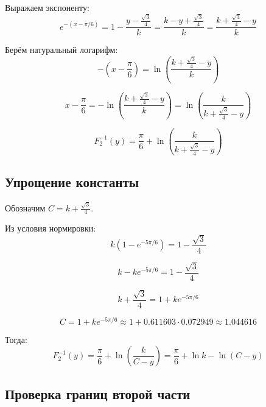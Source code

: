 \documentclass[12pt,a4paper]{article}
\begin{document}
Выражаем экспоненту:
\begin{equation}
e^{-(x-\pi/6)} = 1 - \frac{y - \frac{\sqrt{3}}{4}}{k} = \frac{k - y + \frac{\sqrt{3}}{4}}{k} = \frac{k + \frac{\sqrt{3}}{4} - y}{k}
\end{equation}

Берём натуральный логарифм:
\begin{equation}
-(x-\frac{\pi}{6}) = \ln\left(\frac{k + \frac{\sqrt{3}}{4} - y}{k}\right)
\end{equation}

\begin{equation}
x - \frac{\pi}{6} = -\ln\left(\frac{k + \frac{\sqrt{3}}{4} - y}{k}\right) = \ln\left(\frac{k}{k + \frac{\sqrt{3}}{4} - y}\right)
\end{equation}

\begin{equation}
F_2^{-1}(y) = \frac{\pi}{6} + \ln\left(\frac{k}{k + \frac{\sqrt{3}}{4} - y}\right)
\end{equation}

\subsection*{Упрощение константы}

Обозначим $C = k + \frac{\sqrt{3}}{4}$.

Из условия нормировки:
\begin{equation}
k\left(1 - e^{-5\pi/6}\right) = 1 - \frac{\sqrt{3}}{4}
\end{equation}

\begin{equation}
k - ke^{-5\pi/6} = 1 - \frac{\sqrt{3}}{4}
\end{equation}

\begin{equation}
k + \frac{\sqrt{3}}{4} = 1 + ke^{-5\pi/6}
\end{equation}

\begin{equation}
C = 1 + ke^{-5\pi/6} \approx 1 + 0.611603 \cdot 0.072949 \approx 1.044616
\end{equation}

Тогда:
\begin{equation}
F_2^{-1}(y) = \frac{\pi}{6} + \ln\left(\frac{k}{C - y}\right) = \frac{\pi}{6} + \ln k - \ln(C-y)
\end{equation}

\subsection*{Проверка границ второй части}
\end{document}
